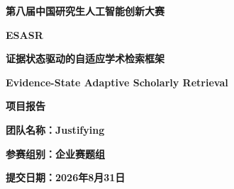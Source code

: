 \documentclass[a4paper,12pt,fontset=none]{ctexart}
\newcommand{\DocDate}{2026年8月31日}
\newcommand{\DocTeam}{Justifying}
\newcommand{\DocGroup}{企业赛题组}
\begin{document}
\color{black}
\thispagestyle{empty}
\begin{center}
  \vspace*{1.8cm}
  {\fontsize{25pt}{33pt}\selectfont\bfseries 第八届中国研究生人工智能创新大赛\par}
  \vspace{3.5cm}
  {\fontsize{28pt}{36pt}\selectfont\bfseries\color{DeepBlue} ESASR\par}
  \vspace{0.45cm}
  {\bfseries 证据状态驱动的自适应学术检索框架\par}
  \vspace{0.3cm}
  {\bfseries Evidence-State Adaptive Scholarly Retrieval\par}
  \vspace{1.0cm}
  {\bfseries 项目报告\par}
  \vfill
  {\bfseries 团队名称：\DocTeam\par}
  \vspace{0.25cm}
  {\bfseries 参赛组别：\DocGroup\par}
  \vspace{0.25cm}
  {\bfseries 提交日期：\DocDate\par}
  \vspace{1.0cm}
\end{center}
\end{document}
